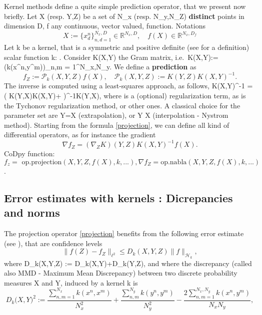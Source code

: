 \documentclass[
]{article}
\def\({}%
\def\){}%
\numberwithin{equation}{section}
\newcommand \RR    {\mathbb{R}}
\begin{document}
Kernel methods define a quite simple prediction operator, that we
present now briefly. Let \(X\) (resp. \(Y,Z\)) be a set of \(N_x\)
(resp. \(N_y,N_Z\)) \textbf{distinct} points in dimension \(D\), \(f\)
any continuous, vector valued, function. Notations
\begin{equation}\label{X}
X :=\{x^n_d\}_{n,d=1}^{N_x,D} \in \RR^{N_x,D}, \quad f(X) \in \RR^{N_x,D_f}
\end{equation} Let \(k\) be a kernel, that is a symmetric and positive
definite (see \cite{BTA} for a definition) scalar function
\(k:  \times {} \mapsto {}\). Consider
\(K(X,Y)\) the Gram matrix,
i.e.~\(K(X,Y):=(k(x^n,y^m))_{n,m = 1}^{N_x,N_y}\). We define a
\textbf{prediction} as \begin{equation} \label{projection}
f_Z := \mathcal{P}_{k}(X,Y,Z)f(X), \quad \mathcal{P}_{k}(X,Y,Z) := K(Y,Z) K(X,Y)^{-1}.
\end{equation} The inverse is computed using a least-squares approach,
as follows, \(K(X,Y)^{-1} = ( K(Y,X)K(X,Y)+ \epsilon)^{-1}K(Y,X)\),
where \(\epsilon\) is a (optional) regularization term, as is the
Tychonov regularization method, or other ones. A classical choice for
the parameter set are \(Y=X\) (extrapolation), or \(Y \subset X\)
(interpolation - Nystrom method). Starting from the formula
\eqref{projection}, we can define all kind of differential operators, as
for instance the gradient \begin{equation} \label{grad}
\nabla f_Z = (\nabla_Z K)(Y,Z) K(X,Y)^{-1} f(X).
\end{equation} CoDpy function: \[
f_z = \text{ op.projection}(X,Y,Z,f(X), k,...),\nabla f_Z = \text{op.nabla}(X,Y,Z,f(X), k,...)
\].

\newpage

\hypertarget{error-estimates-with-kernels-dicrepancies-and-norms}{%
\subsection{Error estimates with kernels : Dicrepancies and
norms}\label{error-estimates-with-kernels-dicrepancies-and-norms}}

The projection operator \eqref{projection} benefits from the following
error estimate (see \cite{PLF-JMM-estimate}), that are confidence levels
\begin{equation} \label{error}
\| f(Z) - f_Z \|_{\ell^2} \le D_k(X,Y,Z) \| f \|_{\mathcal{H}_k},
\end{equation} where \(D_k(X,Y,Z) := D_k(X,Y)+D_k(Y,Z)\), and where the
discrepancy (called also MMD - Maximum Mean Discrepancy) between two
discrete probability measures \(X\) and \(Y\), induced by a kernel \(k\)
is \begin{equation}\label{Dk}
    D_k\big(X,Y\big)^2 := \frac{ \sum_{n,m=1}^{N_x}  k(x^n,x^m)}{N_x^2} + \frac{\sum_{n,m}^{N_y} k(y^n,y^m)}{N_y^2} - \frac{2 \sum_{n,m=1}^{N_x,N_y} k(x^n,y^m)}{N_x N_y},
\end{equation}
\end{document}
